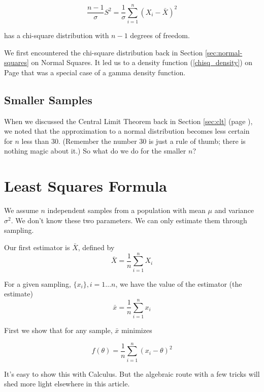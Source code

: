 \documentclass[]{article}
\begin{document}
\begin{equation} \label{chisq2}
\frac{n-1}{\sigma} S^2 =
\frac{1}{\sigma}\sum_{i=1}^n (X_i - \bar{X})^2
\end{equation}

has a chi-square distribution with $n-1$ degrees of freedom.

We first encountered the chi-square distribution back in
Section \ref{sec:normal-squares} on Normal Squares.  It
led us to a density function (\ref{chisq_density}) on Page
\pageref{chisq_density} that was a special case of a
gamma density function.  

\subsection{Smaller Samples}

When we discussed the Central Limit Theorem back in 
Section \ref{sec:clt} (page \pageref{sec:clt}), we noted
that the approximation to a normal distribution becomes
less certain for $n$ less than 30.  (Remember the number
30 is just a rule of thumb; there is nothing magic about
it.)  So what do we do for the smaller $n$?



\appendix

\section{Least Squares Formula} \label{sec:least_squares_formula}

We assume $n$ independent samples from a population with
mean $\mu$ and variance $\sigma^2$.  We don't know these
two parameters.  We can only estimate them through sampling.

Our first estimator is $\bar{X}$, defined by
\begin{equation}
\bar{X} = \frac{1}{n} \sum_{i=1}^n X_i
\end{equation}

For a given sampling, $\{x_i\}, i=1 \ldots n$, we have the
value of the estimator (the estimate)
$$
\bar{x} = \frac{1}{n} \sum_{i=1}^n x_i
$$

First we show that for any sample, $\bar{x}$ minimizes

\begin{equation} \label{least_squares}
f(\theta) = \frac{1}{n} \sum_{i=1}^n (x_i - \theta)^2
\end{equation}

It's easy to show this with Calculus.  But the algebraic
route with a few tricks will shed more light elsewhere in
this article.
\end{document}
